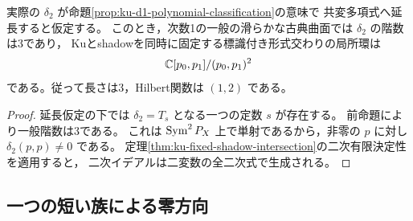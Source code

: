\begin{corollary}[多項式延長の下での一般交わりの長さ3]
\label{cor:ku-d1-conditional-generic-intersection}
実際の $\delta_2$ が命題\ref{prop:ku-d1-polynomial-classification}の意味で
共変多項式へ延長すると仮定する。
このとき，次数1の一般の滑らかな古典曲面では $\delta_2$ の階数は3であり，
Kuとshadowを同時に固定する標識付き形式交わりの局所環は
\[
                         \mathbb C[p_0,p_1]/(p_0,p_1)^2
\]
である。従って長さは3，Hilbert関数は $(1,2)$ である。
\end{corollary}
\begin{proof}
延長仮定の下では $\delta_2=T_s$ となる一つの定数 $s$ が存在する。
前命題により一般階数は3である。
これは $\operatorname{Sym}^2P_X$ 上で単射であるから，非零の $p$ に対し
$\delta_2(p,p)\ne0$ である。
定理\ref{thm:ku-fixed-shadow-intersection}の二次有限決定性を適用すると，
二次イデアルは二変数の全二次式で生成される。
\end{proof}

\subsection{一つの短い族による零方向}

